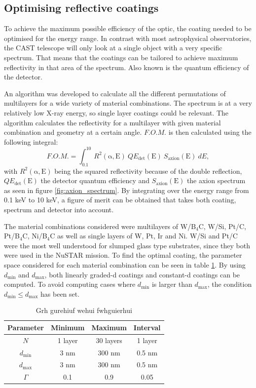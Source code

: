 \subsection{Optimising reflective coatings}
To achieve the maximum possible efficiency of the optic, the coating needed to be optimised for the energy range. In contrast with most astrophysical observatories, the CAST telescope will only look at a single object with a very specific spectrum. That means that the coatings can be tailored to achieve maximum reflectivity in that area of the spectrum. Also known is the quantum efficiency of the detector.

An algorithm was developed to calculate all the different permutations of multilayers for a wide variety of material combinations. The spectrum is at a very relatively low X-ray energy, so single layer coatings could be relevant. The algorithm calculates the reflectivity for a multilayer with given material combination and geometry at a certain angle. $F.O.M.$ is then calculated using the following integral:
\begin{equation}\label{eq:fom}
	F.O.M. = \int_{0.1}^{10} R^2(\mathrm{\alpha},\text{E})\ QE_{\text{det}}(\text{E})\ S_{\text{axion}}(\text{E})\ dE,
\end{equation}
with $R^2(\mathrm{\alpha},\text{E})$ being the squared reflectivity because of the double reflection, $QE_{\text{det}}(\text{E})$ the detector quantum efficiency and $S_{\text{axion}}(\text{E})$ the axion spectrum as seen in figure \ref{fig:axion_spectrum}. By integrating over the energy range from 0.1 keV to 10 keV, a figure of merit can be obtained that takes both coating, spectrum and detector into account.

The material combinations considered were multilayers of W/B$_4$C, W/Si, Pt/C, Pt/B$_4$C, Ni/B$_4$C as well as single layers of W, Pt, Ir and Ni. W/Si and Pt/C were the most well understood for slumped glass type substrates, since they both were used in the NuSTAR mission. To find the optimal coating, the parameter space considered for each material combination can be seen in table \ref{tab:cast_parameter_space}. By using $d_{\text{min}}$ and $d_{\text{max}}$, both linearly graded-d coatings and constant-d coatings can be computed. To avoid computing cases where \(d_{\text{min}}\) is larger than \(d_{\text{max}}\), the condition \(d_{\text{min}} \leq d_{\text{max}}\) has been set.

\begin{table}[!h]
\begin{center}
\begin{tabular}{c|c|c|c}
Parameter & Minimum & Maximum & Interval \\
\hline
$N$ & 1 layer & 30 layers & 1 layer \\
$d_{\text{min}}$ & 3 nm & 300 nm & 0.5 nm \\
$d_{\text{max}}$ & 3 nm & 300 nm & 0.5 nm \\
$\Gamma$ & 0.1 & 0.9 & 0.05 \\
\end{tabular}
\end{center}
\caption{\footnotesize Grh gurehiuf wehui fwhguierhui}\label{tab:cast_parameter_space}
\end{table}

